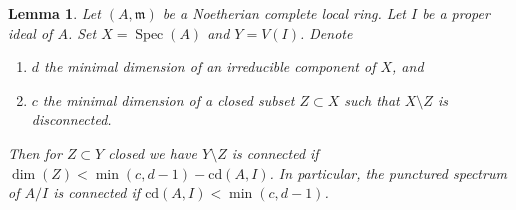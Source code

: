 \documentclass[10pt,a4paper]{amsart}
\newenvironment{reference}{\comment}{\endcomment}
\theoremstyle{plain}
\newtheorem{lemma}[subsection]{Lemma}
\theoremstyle{definition}
\theoremstyle{remark}
\numberwithin{equation}{subsection}
\def\Spec{\mathop{\mathrm{Spec}}}
\renewenvironment{reference}{}{}
\begin{document}
\begin{lemma}
\label{lemma-punctured-still-connected}
\begin{reference}
\cite[Theorem 1.6]{Varbaro}
\end{reference}
Let $(A, \mathfrak m)$ be a Noetherian complete local ring.
Let $I$ be a proper ideal of $A$.
Set $X = \Spec(A)$ and $Y = V(I)$.
Denote
\begin{enumerate}
\item $d$ the minimal dimension of an irreducible component of $X$, and
\item $c$ the minimal dimension of a closed subset $Z \subset X$
such that $X \setminus Z$ is disconnected.
\end{enumerate}
Then for $Z \subset Y$ closed we have $Y \setminus Z$ is connected if
$\dim(Z) < \min(c, d - 1) - \text{cd}(A, I)$. In particular, the punctured
spectrum of $A/I$ is connected if $\text{cd}(A, I) < \min(c, d - 1)$.
\end{lemma}
\end{document}
